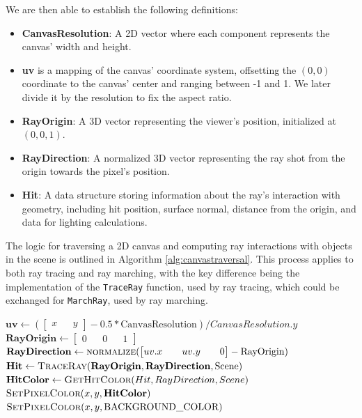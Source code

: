 We are then able to establish the following definitions:

\begin{itemize}
    \item \textbf{CanvasResolution}: A 2D vector where each component represents the canvas' width and height.
    \item \textbf{uv} is a mapping of the canvas' coordinate system, offsetting the $(0, 0)$ coordinate to the canvas' center and ranging between -1 and 1. We later divide it by the resolution to fix the aspect ratio.
    \item \textbf{RayOrigin}: A 3D vector representing the viewer's position, initialized at $(0, 0, 1)$.
    \item \textbf{RayDirection}: A normalized 3D vector representing the ray shot from the origin towards the pixel's position.
    \item \textbf{Hit}: A data structure storing information about the ray's interaction with geometry, including hit position, surface normal, distance from the origin, and data for lighting calculations.
\end{itemize}


The logic for traversing a 2D canvas and computing ray interactions with objects in the scene is outlined in Algorithm \ref{alg:canvastraversal}. This process applies to both ray tracing and ray marching, with the key difference being the implementation of the \texttt{TraceRay} function, used by ray tracing, which could be exchanged for \texttt{MarchRay}, used by ray marching.

\begin{algorithm}[ht]
\caption{Canvas Traversal}
\label{alg:canvastraversal}
\begin{algorithmic}[1]
            \State $\mathbf{uv} \gets \left(\begin{bmatrix} x && y \end{bmatrix} - 0.5 * \text{CanvasResolution}\right) / CanvasResolution.y$
            \State $\mathbf{RayOrigin} \gets \begin{bmatrix} 0 && 0 && 1 \end{bmatrix}$
            \State $\mathbf{RayDirection} \gets \Call{normalize}{\begin{bmatrix} uv.x && uv.y && 0 \end{bmatrix} - \text{RayOrigin}}$
            \State $\mathbf{Hit} \gets \Call{TraceRay}{\mathbf{RayOrigin}, \mathbf{RayDirection}, \text{Scene}}$
                \State $\mathbf{HitColor} \gets \Call{GetHitColor}{Hit, RayDirection, Scene}$
                \State $\Call{SetPixelColor}{x, y, \mathbf{HitColor}}$
            \Else
                \State $\Call{SetPixelColor}{x, y, \text{BACKGROUND\_COLOR}}$
            \EndIf
        \EndFor
    \EndFor
\EndProcedure
\end{algorithmic}
\end{algorithm}

